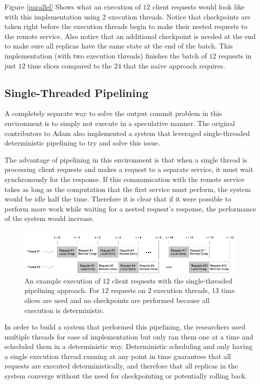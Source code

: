 \documentclass[11pt, oneside]{report}
\begin{document}
Figure \ref{parallel} Shows what an execution of $12$ client requests would look like with this implementation using $2$ execution threads. 
Notice that checkpoints are taken right before the execution threads begin to make their nested requests to the remote service. 
Also notice that an additional checkpoint is needed at the end to make sure all replicas have the same state at the end of the batch.
This implementation (with two execution threads) finishes the batch of $12$ requests in just $12$ time slices compared to the $24$ that the naive approach requires.

\subsection{Single-Threaded Pipelining}\label{STP}

A completely separate way to solve the output commit problem in this environment is to simply not execute in a speculative manner. 
The original contributors to Adam also implemented a system that leveraged single-threaded deterministic pipelining to try and solve this issue.

The advantage of pipelining in this environment is that when a single thread is processing client requests and makes a request to a separate service, it must wait synchronously for the response. 
If this communication with the remote service takes as long as the computation that the first service must perform, the system would be idle half the time.
Therefore it is clear that if it were possible to perform more work while waiting for a nested request's response, the performance of the system would increase.

\begin{figure}[h]
\centering
\includegraphics[width=1.0\textwidth]{SequentialPipelined.png}
\caption{\label{seqpipe}An example execution of $12$ client requests with the single-threaded pipelining approach. For $12$ requests on $2$ execution threads, $13$ time slices are used and no checkpoints are performed because all execution is deterministic.}
\end{figure}

In order to build a system that performed this pipelining, the researchers used multiple threads for ease of implementation but only ran them one at a time and scheduled them in a deterministic way. 
Deterministic scheduling and only having a single execution thread running at any point in time guarantees that all requests are executed deterministically, and therefore that all replicas in the system converge without the need for checkpointing or potentially rolling back.
\end{document}

